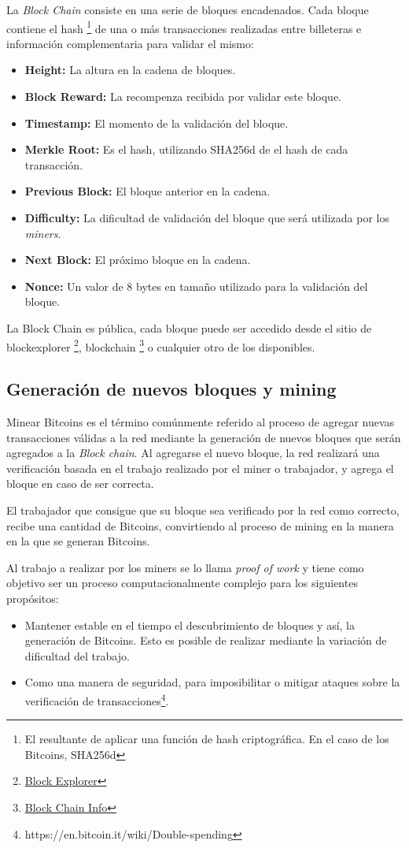 \documentclass[a4paper, 10pt, twoside]{article}
\begin{document}
La \textit{Block Chain} consiste en una serie de bloques encadenados. Cada bloque contiene el hash \footnote{El resultante de aplicar una función de hash criptográfica. En el caso de los Bitcoins, SHA256d} de una o más transacciones realizadas entre billeteras e información complementaria para validar el mismo:
\begin{itemize}
	\item \textbf{Height:} La altura en la cadena de bloques.
	\item \textbf{Block Reward:} La recompenza recibida por validar este bloque.
	\item \textbf{Timestamp:} El momento de la validación del bloque.
	\item \textbf{Merkle Root:} Es el hash, utilizando SHA256d de el hash de cada transacción.
	\item \textbf{Previous Block:} El bloque anterior en la cadena.
	\item \textbf{Difficulty:} La dificultad de validación del bloque que será utilizada por los \textit{miners}.
	\item \textbf{Next Block:} El próximo bloque en la cadena.
	\item \textbf{Nonce:} Un valor de 8 bytes en tamaño utilizado para la validación del bloque.
\end{itemize}

La Block Chain es pública, cada bloque puede ser accedido desde el sitio de blockexplorer \footnote{\href{http://testnet.blockexplorer.com}{Block Explorer}}, blockchain \footnote{\href{https://blockchain.info/}{Block Chain Info}} o cualquier otro de los disponibles.

\subsection{Generación de nuevos bloques y mining}
Minear Bitcoins es el término comúnmente referido al proceso de agregar nuevas transacciones válidas a la red mediante la generación de nuevos bloques que serán agregados a la \textit{Block chain}. Al agregarse el nuevo bloque, la red realizará una verificación basada en el trabajo realizado por el miner o trabajador, y agrega el bloque en caso de ser correcta. 

El trabajador que consigue que su bloque sea verificado por la red como correcto, recibe una cantidad de Bitcoins, convirtiendo al proceso de mining en la manera en la que se generan Bitcoins.

Al trabajo a realizar por los miners se lo llama \textit{proof of work} y tiene como objetivo ser un proceso computacionalmente complejo para los siguientes propósitos:
\begin{itemize}
	\item Mantener estable en el tiempo el descubrimiento de bloques y así, la generación de Bitcoins. Esto es posible de realizar mediante la variación de dificultad del trabajo.
	\item Como una manera de seguridad, para imposibilitar o mitigar ataques sobre la verificación de transacciones\footnote{https://en.bitcoin.it/wiki/Double-spending}.
\end{itemize}
\end{document}
